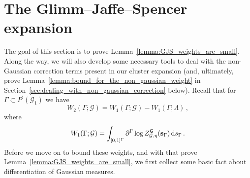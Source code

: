 \documentclass[11pt]{article}
\theoremstyle{definition}
\theoremstyle{remark}
\numberwithin{theorem}{section}
\def\La{{\Lambda}}
\def\Ga{{\Gamma}}
\begin{document}
    \section{The Glimm--Jaffe--Spencer expansion}
    \label{sec:the_GJS_expansion_for_gaussian_partition_functions}
 
    The goal of this section is to prove Lemma~\ref{lemma:GJS_weights_are_small}. Along the way, we will also develop some necessary tools to deal with the non-Gaussian correction terms present in our cluster expansion (and, ultimately, prove Lemma~\ref{lemma:bound_for_the_non_gaussian_weight} in Section~\ref{sec:dealing_with_non_gaussian_correction} below). Recall that for $\Ga\subset P^\prime(\mathcal{G}_1)$ we have 
    \[
    W_2(\Ga;\mathcal{G}) = W_1(\Ga;\mathcal{G}) - W_1(\Ga;\La) \, ,
    \]
    where 
    \[
    W_1(\Ga;\mathcal{G}) = \int_{[0,1]^{\Ga}} \partial^\Ga \log Z_{\mathcal{G},\eta}^{\sf G} (\mathbf{s}_\Ga) \, {\rm d} s_{\Ga}\, .
    \]
    Before we move on to bound these weights, and with that prove Lemma~\ref{lemma:GJS_weights_are_small}, we first collect some basic fact about differentiation of Gaussian measures. 
    
\end{document}
